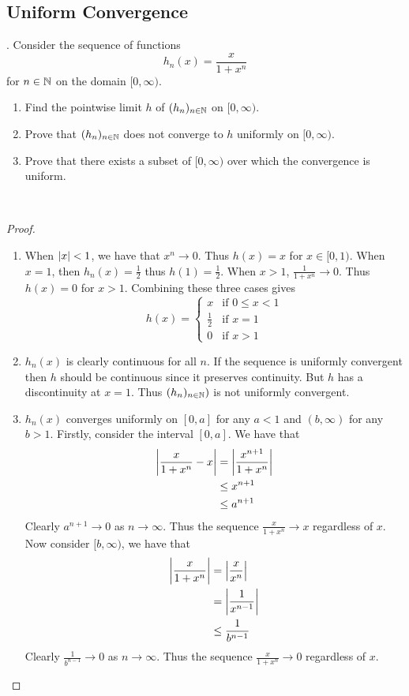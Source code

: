 \documentclass[a4paper]{article}
\begin{document}
\subsection{Uniform Convergence}
\begin{qtn}{}{}
\thetcbcounter.\;\; Consider the sequence of functions $$h_n(x)=\frac{x}{1+x^n}$$ for $n\in\mathbb{N}$ on the domain $[0,\infty)$. 
\begin{enumerate}[label=\alph*)]
\item Find the pointwise limit $h$ of $(h_n)_{n\in\mathbb{N}}$ on $[0,\infty)$. 
\item Prove that $(h_n)_{n\in\mathbb{N}}$ does not converge to $h$ uniformly on $[0,\infty)$. 
\item Prove that there exists a subset of $[0,\infty)$ over which the convergence is uniform. 
\end{enumerate}~\\\hspace*{\fill}\cite{R0002}\tcbline
\begin{proof}~\\
\begin{enumerate}[label=\alph*)]
\item When $\abs{x}<1$, we have that $x^n\to 0$. Thus $h(x)=x$ for $x\in[0,1)$. When $x=1$, then $h_n(x)=\frac{1}{2}$ thus $h(1)=\frac{1}{2}$. When $x>1$, $\frac{1}{1+x^n}\to 0$. Thus $h(x)=0$ for $x>1$. Combining these three cases gives $$h(x)=\begin{cases}
x & \text{if }0\leq x<1\\
\frac{1}{2} & \text{if } x=1\\
0 & \text{if }x>1
\end{cases}$$
\item $h_n(x)$ is clearly continuous for all $n$. If the sequence is uniformly convergent then $h$ should be continuous since it preserves continuity. But $h$ has a discontinuity at $x=1$. Thus $(h_n)_{n\in\mathbb{N}})$ is not uniformly convergent. 
\item $h_n(x)$ converges uniformly on $[0,a]$ for any $a<1$ and $(b,\infty)$ for any $b>1$. Firstly, consider the interval $[0,a]$. We have that 
\begin{align*}
\abs{\frac{x}{1+x^n}-x}&=\abs{\frac{x^{n+1}}{1+x^n}}\\
&\leq x^{n+1}\\
&\leq a^{n+1}
\end{align*}
Clearly $a^{n+1}\to 0$ as $n\to\infty$. Thus the sequence $\frac{x}{1+x^n}\to x$ regardless of $x$. Now consider $[b,\infty)$, we have that 
\begin{align*}
\abs{\frac{x}{1+x^n}}&=\abs{\frac{x}{x^n}}\\
&=\abs{\frac{1}{x^{n-1}}}\\
&\leq\frac{1}{b^{n-1}}
\end{align*}
Clearly $\frac{1}{b^{n-1}}\to 0$ as $n\to\infty$. Thus the sequence $\frac{x}{1+x^n}\to 0$ regardless of $x$. 
\end{enumerate}\tcbline
\end{proof}
\end{qtn}
\end{document}

